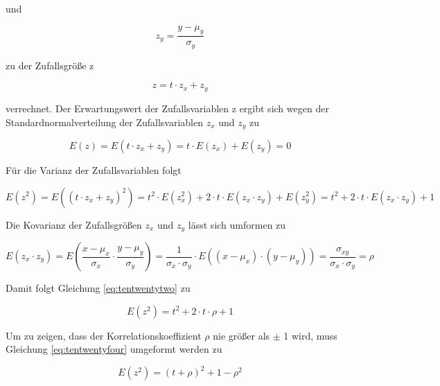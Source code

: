 \noindent und

\begin{equation}\label{eq:tennineteen}
z_{y} =\dfrac{y-\mu _{y}}{\sigma _{y}}
\end{equation}

\noindent zu der Zufallsgr\"{o}{\ss}e z

\begin{equation}\label{eq:tentwenty}
z=t\cdot z_{x} +z_{y}
\end{equation}

verrechnet. Der Erwartungswert der Zufallsvariablen z ergibt sich wegen der Standardnormalverteilung der Zufallsvariablen $z_{x}$ und $z_{y}$ zu

\begin{equation}\label{eq:tentwentyone}
E(z)=E(t\cdot z_{x} +z_{y})=t\cdot E(z_{x})+E(z_{y})=0
\end{equation}

\noindent F\"{u}r die Varianz der Zufallsvariablen folgt

\begin{equation}\label{eq:tentwentytwo}
E(z^{2})=E\left((t\cdot z_{x} +z_{y})^{2} \right)=t^{2} \cdot E(z_{x}^{2})+2\cdot t\cdot E(z_{x} \cdot z_{y})+E(z_{y}^{2})=t^{2} +2\cdot t\cdot E(z_{x} \cdot z_{y})+1
\end{equation}

\noindent Die Kovarianz der Zufallsgr\"{o}{\ss}en $z_{x}$ und $z_{y}$ l\"{a}sst sich umformen zu

\begin{equation}\label{eq:tentwentythree}
E(z_{x} \cdot z_{y})=E\left(\dfrac{x-\mu _{x}}{\sigma _{x}} \cdot \dfrac{y-\mu _{y}}{\sigma _{y}} \right)=\dfrac{1}{\sigma _{x} \cdot \sigma _{y}} \cdot E\left((x-\mu _{x})\cdot (y-\mu _{y})\right)=\dfrac{\sigma _{xy}}{\sigma _{x} \cdot \sigma _{y}} =\rho
\end{equation}

\noindent Damit folgt Gleichung \eqref{eq:tentwentytwo} zu

\begin{equation}\label{eq:tentwentyfour}
E(z^{2})=t^{2} +2\cdot t\cdot \rho +1
\end{equation}

\noindent Um zu zeigen, dass der Korrelationskoeffizient $\rho$ nie gr\"{o}{\ss}er als $\pm$ 1 wird, muss Gleichung \eqref{eq:tentwentyfour} umgeformt werden zu

\begin{equation}\label{eq:tentwentyfive}
E(z^{2})=(t+\rho)^{2} +1-\rho ^{2}
\end{equation}

